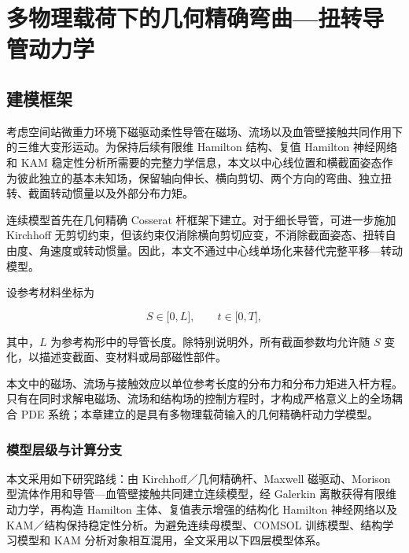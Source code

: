 \section{多物理载荷下的几何精确弯曲---扭转导管动力学}\label{sec:rod-model}

\subsection{建模框架}\label{sec:rod-1-1}

考虑空间站微重力环境下磁驱动柔性导管在磁场、流场以及血管壁接触共同作用下的三维大变形运动。为保持后续有限维 Hamilton 结构、复值 Hamilton 神经网络和 KAM 稳定性分析所需要的完整力学信息，本文以中心线位置和横截面姿态作为彼此独立的基本未知场，保留轴向伸长、横向剪切、两个方向的弯曲、独立扭转、截面转动惯量以及外部分布力矩。

连续模型首先在几何精确 Cosserat 杆框架下建立。对于细长导管，可进一步施加 Kirchhoff 无剪切约束，但该约束仅消除横向剪切应变，不消除截面姿态、扭转自由度、角速度或转动惯量。因此，本文不通过中心线单场化来替代完整平移---转动模型。\cite{Simo1985FiniteStrainBeam,Antman2005Elasticity,MarsdenRatiu1999MechanicsSymmetry}

设参考材料坐标为

\begin{equation}
\label{eq:rod-1-1}
S \in \lbrack 0,L\rbrack,\quad\quad t \in \lbrack 0,T\rbrack,
\end{equation}

其中，\(L\) 为参考构形中的导管长度。除特别说明外，所有截面参数均允许随 \(S\) 变化，以描述变截面、变材料或局部磁性部件。

本文中的磁场、流场与接触效应以单位参考长度的分布力和分布力矩进入杆方程。只有在同时求解电磁场、流场和结构场的控制方程时，才构成严格意义上的全场耦合 PDE 系统；本章建立的是具有多物理载荷输入的几何精确杆动力学模型。

\subsubsection{模型层级与计算分支}\label{sec:rod-1-1-1}

本文采用如下研究路线：由 Kirchhoff／几何精确杆、Maxwell 磁驱动、Morison 型流体作用和导管---血管壁接触共同建立连续模型，经 Galerkin 离散获得有限维动力学，再构造 Hamilton 主体、复值表示增强的结构化 Hamilton 神经网络以及 KAM／结构保持稳定性分析。为避免连续母模型、COMSOL 训练模型、结构学习模型和 KAM 分析对象相互混用，全文采用以下四层模型体系。


